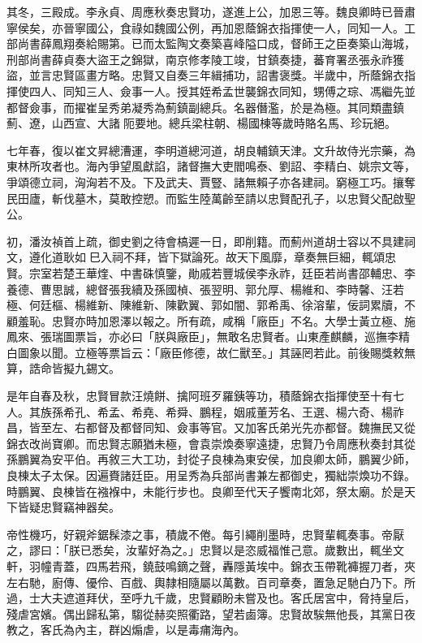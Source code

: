 \begin{pinyinscope}
其冬，三殿成。李永貞、周應秋奏忠賢功，遂進上公，加恩三等。魏良卿時已晉肅寧侯矣，亦晉寧國公，食祿如魏國公例，再加恩蔭錦衣指揮使一人，同知一人。工部尚書薛鳳翔奏給賜第。已而太監陶文奏築喜峰隘口成，督師王之臣奏築山海城，刑部尚書薛貞奏大盜王之錦獄，南京修孝陵工竣，甘鎮奏捷，蕃育署丞張永祚獲盜，並言忠賢區畫方略。忠賢又自奏三年緝捕功，詔書褒獎。半歲中，所蔭錦衣指揮使四人、同知三人、僉事一人。授其姪希孟世襲錦衣同知，甥傅之琮、馮繼先並都督僉事，而擢崔呈秀弟凝秀為薊鎮副總兵。名器僭濫，於是為極。其同類盡鎮薊、遼，山西宣、大諸阨要地。總兵梁柱朝、楊國棟等歲時賂名馬、珍玩絕。

七年春，復以崔文昇總漕運，李明道總河道，胡良輔鎮天津。文升故侍光宗藥，為東林所攻者也。海內爭望風獻諂，諸督撫大吏閻鳴泰、劉詔、李精白、姚宗文等，爭頌德立祠，洶洶若不及。下及武夫、賈豎、諸無賴子亦各建祠。窮極工巧。攘奪民田廬，斬伐墓木，莫敢控愬。而監生陸萬齡至請以忠賢配孔子，以忠賢父配啟聖公。

初，潘汝禎首上疏，御史劉之待會槁遲一日，即削籍。而薊州道胡士容以不具建祠文，遵化道耿如巳入祠不拜，皆下獄論死。故天下風靡，章奏無巨細，輒頌忠賢。宗室若楚王華煃、中書硃慎鑒，勛戚若豐城侯李永祚，廷臣若尚書邵輔忠、李養德、曹思誠，總督張我續及孫國楨、張翌明、郭允厚、楊維和、李時馨、汪若極、何廷樞、楊維新、陳維新、陳歡翼、郭如闇、郭希禹、徐溶輩，佞詞累牘，不顧羞恥。忠賢亦時加恩澤以報之。所有疏，咸稱「廠臣」不名。大學士黃立極、施鳳來、張瑞圖票旨，亦必曰「朕與廠臣」，無敢名忠賢者。山東產麒麟，巡撫李精白圖象以聞。立極等票旨云：「廠臣修德，故仁獸至。」其誣罔若此。前後賜獎敕無算，誥命皆擬九錫文。

是年自春及秋，忠賢冒款汪燒餅、擒阿班歹羅銕等功，積蔭錦衣指揮使至十有七人。其族孫希孔、希孟、希堯、希舜、鵬程，姻戚董芳名、王選、楊六奇、楊祚昌，皆至左、右都督及都督同知、僉事等官。又加客氏弟光先亦都督。魏撫民又從錦衣改尚寶卿。而忠賢志願猶未極，會袁崇煥奏寧遠捷，忠賢乃令周應秋奏封其從孫鵬翼為安平伯。再敘三大工功，封從子良棟為東安侯，加良卿太師，鵬翼少師，良棟太子太保。因遍賚諸廷臣。用呈秀為兵部尚書兼左都御史，獨絀崇煥功不錄。時鵬翼、良棟皆在襁褓中，未能行步也。良卿至代天子饗南北郊，祭太廟。於是天下皆疑忠賢竊神器矣。

帝性機巧，好親斧鋸髹漆之事，積歲不倦。每引繩削墨時，忠賢輩輒奏事。帝厭之，謬曰：「朕已悉矣，汝輩好為之。」忠賢以是恣威福惟己意。歲數出，輒坐文軒，羽幢青蓋，四馬若飛，鐃鼓鳴鏑之聲，轟隱黃埃中。錦衣玉帶靴褲握刀者，夾左右馳，廚傳、優伶、百戲、輿隸相隨屬以萬數。百司章奏，置急足馳白乃下。所過，士大夫遮道拜伏，至呼九千歲，忠賢顧盼未嘗及也。客氏居宮中，脅持皇后，殘虐宮嬪。偶出歸私第，騶從赫奕照衢路，望若鹵簿。忠賢故騃無他長，其黨日夜教之，客氏為內主，群凶煽虐，以是毒痡海內。


\end{pinyinscope}
